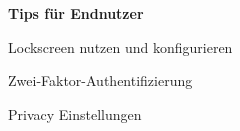 \begin{frame}
	\centering
	\textbf{Tips für Endnutzer}
	\begin{block}{}
		Lockscreen nutzen und konfigurieren
	\end{block}
	\begin{block}{}
		Zwei-Faktor-Authentifizierung
	\end{block}
	\begin{block}{}
		Privacy Einstellungen
	\end{block}
\end{frame}